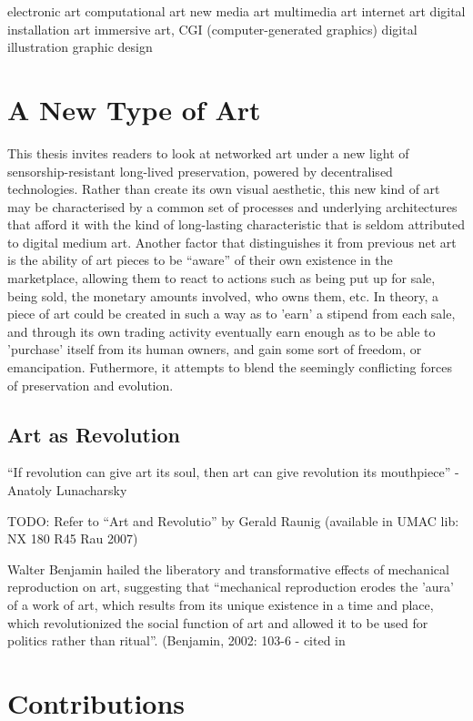 electronic art
computational art
new media art
multimedia art
internet art
digital installation art
immersive art,
CGI (computer-generated graphics)
digital illustration
graphic design


\section{A New Type of Art}

This thesis invites readers to look at networked art under a new light of sensorship-resistant long-lived preservation, powered by decentralised technologies. Rather than create its own visual aesthetic, this new kind of art may be characterised by a common set of processes and underlying architectures that afford it with the kind of long-lasting characteristic that is seldom attributed to digital medium art.
Another factor that distinguishes it from previous net art is the ability of art pieces to be ``aware'' of their own existence in the marketplace, allowing them to react to actions such as being put up for sale, being sold, the monetary amounts involved, who owns them, etc.
In theory, a piece of art could be created in such a way as to 'earn' a stipend from each sale, and through its own trading activity eventually earn enough as to be able to 'purchase' itself from its human owners, and gain some sort of freedom, or emancipation.
Futhermore, it attempts to blend the seemingly conflicting forces of preservation and evolution.

\subsection{Art as Revolution}

``If revolution can give art its soul, then art can give revolution its mouthpiece'' - Anatoly Lunacharsky

TODO: Refer to ``Art and Revolutio'' by Gerald Raunig (available in UMAC lib: NX 180 R45 Rau 2007)

Walter Benjamin hailed the liberatory and transformative effects of mechanical reproduction on art, suggesting that ``mechanical reproduction erodes the 'aura' of a work of art, which results from its unique existence in a time and place, which revolutionized the social function of art and allowed it to be used for politics rather than ritual''. (Benjamin, 2002: 103-6 - cited in \cite[p.3]{gereArtTimeTechnology2006}

\section{Contributions}

